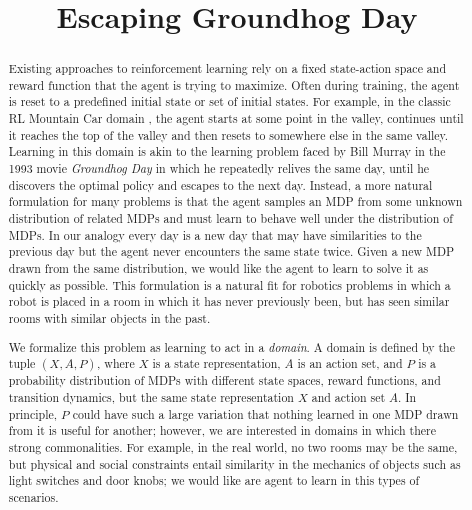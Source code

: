 \documentclass[11pt]{article} %
\title{Escaping Groundhog Day}
\author{}
\begin{document}
\maketitle

\begin{abstract}
Existing approaches to reinforcement learning rely on a fixed state-action space and reward function that the agent is trying to maximize. Often during training, the agent is reset to a predefined initial state or set of initial states. For example, in the classic RL Mountain Car domain \cite{}, the agent starts at some point in the valley, continues until it reaches the top of the valley and then resets to somewhere else in the same valley. Learning in this domain is akin to the learning problem faced by Bill Murray in the 1993 movie {\em Groundhog Day} in which he repeatedly relives the same day, until he discovers the optimal policy and escapes to the next day. Instead, a more natural formulation for many problems is that the agent samples an MDP from some unknown distribution of related MDPs and must learn to behave well under the distribution of MDPs. In our analogy every day is a new day that may have similarities to the previous day but the agent never encounters the same state twice. Given a new MDP drawn from the same distribution, we would like the agent to learn to solve it as quickly as possible. This formulation is a natural fit for robotics problems in which a robot is placed in a room in which it has never previously been, but has seen similar rooms with similar objects in the past. 

We formalize this problem as learning to act in a {\em domain}. A domain is defined by the tuple $(X, A, P)$, where $X$ is a state representation, $A$ is an action set, and $P$ is a probability distribution of MDPs with different state spaces, reward functions, and transition dynamics, but the same state representation $X$ and action set $A$. In principle, $P$ could have such a large variation that nothing learned in one MDP drawn from it is useful for another; however, we are interested in domains in which there strong commonalities. For example, in the real world, no two rooms may be the same, but physical and social constraints entail similarity in the mechanics of objects such as light switches and door knobs; we would like are agent to learn in this types of scenarios.


\end{abstract}
\end{document}

